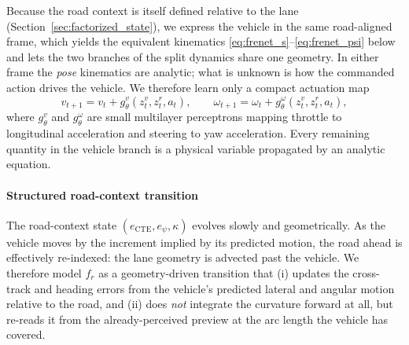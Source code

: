 \documentclass[preprint,12pt]{elsarticle}
\newcommand{\zv}{z^{v}}      %
\newcommand{\zr}{z^{r}}      %
\begin{document}
Because the road context is itself defined relative to the lane
(Section~\ref{sec:factorized_state}), we express the vehicle in the same
road-aligned frame, which yields the equivalent kinematics
\eqref{eq:frenet_s}--\eqref{eq:frenet_psi} below and lets the two branches of the
split dynamics share one geometry.
In either frame the \emph{pose} kinematics are analytic; what is unknown is how
the commanded action drives the vehicle.
We therefore learn only a compact actuation map
\begin{equation}
    v_{t+1} = v_t + g^v_\theta(\zv_t, \zr_t, a_t),
    \qquad
    \omega_{t+1} = \omega_t + g^\omega_\theta(\zv_t, \zr_t, a_t),
    \label{eq:actuation}
\end{equation}
where $g^v_\theta$ and $g^\omega_\theta$ are small multilayer perceptrons mapping
throttle to longitudinal acceleration and steering to yaw acceleration.
Every remaining quantity in the vehicle branch is a physical variable propagated
by an analytic equation.

\paragraph{Structured road-context transition}
The road-context state $(e_{\mathrm{CTE}}, e_\psi, \kappa)$ evolves slowly and
geometrically.
As the vehicle moves by the increment implied by its predicted motion, the road
ahead is effectively re-indexed: the lane geometry is advected past the vehicle.
We therefore model $f_r$ as a geometry-driven transition that (i) updates the
cross-track and heading errors from the vehicle's predicted lateral and angular
motion relative to the road, and (ii) does \emph{not} integrate the curvature
forward at all, but re-reads it from the already-perceived preview at the arc
length the vehicle has covered.
\end{document}
